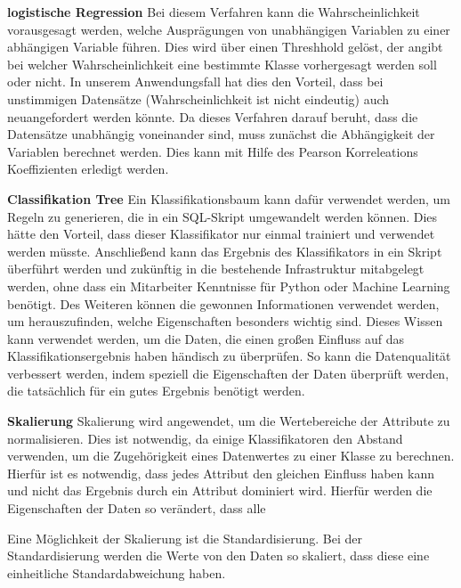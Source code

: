 \textbf{logistische Regression} %
Bei diesem Verfahren kann die Wahrscheinlichkeit vorausgesagt werden, welche Ausprägungen von unabhängigen Variablen zu einer abhängigen Variable führen. 
Dies wird über einen Threshhold gelöst, der angibt bei welcher Wahrscheinlichkeit eine bestimmte Klasse vorhergesagt werden soll oder nicht.
In unserem Anwendungsfall hat dies den Vorteil, dass bei unstimmigen Datensätze (Wahrscheinlichkeit ist nicht eindeutig) auch neuangefordert werden könnte. 
Da dieses Verfahren darauf beruht, dass die Datensätze unabhängig voneinander sind, muss zunächst die Abhängigkeit der Variablen berechnet werden.
Dies kann mit Hilfe des Pearson Korreleations Koeffizienten erledigt werden.

\textbf{Classifikation Tree}
Ein Klassifikationsbaum kann dafür verwendet werden, um Regeln zu generieren, die in ein SQL-Skript umgewandelt werden können.
Dies hätte den Vorteil, dass dieser Klassifikator nur einmal trainiert und verwendet werden müsste.
Anschließend kann das Ergebnis des Klassifikators in ein Skript überführt werden und zukünftig in die bestehende Infrastruktur mitabgelegt werden, ohne dass ein Mitarbeiter Kenntnisse für Python oder Machine Learning benötigt. 
Des Weiteren können die gewonnen Informationen verwendet werden, um herauszufinden, welche Eigenschaften besonders wichtig sind.
Dieses Wissen kann verwendet werden, um die Daten, die einen großen Einfluss auf das Klassifikationsergebnis haben händisch zu überprüfen. 
So kann die Datenqualität verbessert werden, indem speziell die Eigenschaften der Daten überprüft werden, die tatsächlich für ein gutes Ergebnis benötigt werden.





\textbf{Skalierung}
Skalierung wird angewendet, um die Wertebereiche der Attribute zu normalisieren. 
Dies ist notwendig, da einige Klassifikatoren den Abstand verwenden, um die Zugehörigkeit eines Datenwertes zu einer Klasse zu berechnen.
Hierfür ist es notwendig, dass jedes Attribut den gleichen Einfluss haben kann und nicht das Ergebnis durch ein Attribut dominiert wird. 
Hierfür werden die Eigenschaften der Daten so verändert, dass alle 

Eine Möglichkeit der Skalierung ist die Standardisierung. 
Bei der Standardisierung werden die Werte von den Daten so skaliert, dass diese eine einheitliche Standardabweichung haben. %

